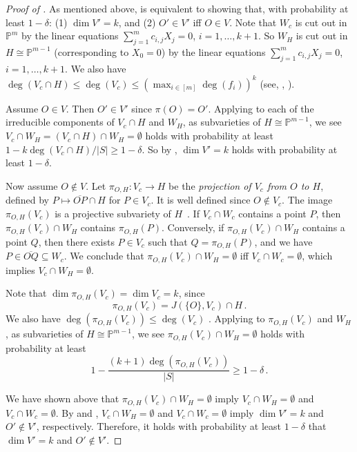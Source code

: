 \documentclass{toc}
\newcommand{\proj}{\mathbb{P}}
\begin{document}
\begin{proof}[Proof of ]
As mentioned above,  is equivalent to showing that, with probability at least $1-\delta$:  (1) $\dim V'=k$, and (2) $O'\in V'$ iff  $O\in V$.
Note that $W_c$ is cut out in $\proj^m$ by the linear equations $\sum_{j=1}^{m} c_{i,j} X_j=0$, $i=1,\dots,k+1$.
So $W_H$ is cut out in $H\cong \proj^{m-1}$ (corresponding to $X_0=0$) by the linear equations $\sum_{j=1}^m c_{i,j} X_j=0$, $i=1,\dots,k+1$. 
We also have $\deg(V_c\cap H)\leq \deg(V_c)\leq (\max_{i\in [m]}\deg(f_i))^k$ (see, \eg, \cite[Theorem~8.48]{burgisser2013algebraic}).

Assume $O\in V$. Then $O'\in V'$ since $\pi(O)=O'$. 
Applying  to  each of the irreducible components of $V_c\cap H$ and $W_H$, as subvarieties of $H\cong\proj^{m-1}$, we see $V_c\cap W_H=(V_c\cap H)\cap W_H=\emptyset$ holds with probability at least $1-k\deg(V_c \cap H)/|S|\geq 1-\delta$.
So by , $\dim V'=k$ holds with probability at least $1-\delta$.

Now assume $O\not\in V$. 
Let $\pi_{O, H}: V_c\to H$ be the \emph{projection of $V_c$ from $O$ to $H$}, defined by $P\mapsto \overline{OP}\cap H$ for $P\in V_c$. It is well defined since $O\not\in V_c$. 
The image $\pi_{O,H}(V_c)$ is a projective subvariety of $H$~\cite[Theorem~3.5]{Har92}. 
If $V_c\cap W_c$ contains a point $P$, then $\pi_{O,H}(V_c)\cap W_H$ contains $\pi_{O,H}(P)$.
Conversely, if $\pi_{O,H}(V_c)\cap W_H$ contains a point $Q$, then there exists $P\in V_c$ such that $Q=\pi_{O,H}(P)$, and we have $P\in\overline{O Q}\subseteq W_c$.
We conclude that $\pi_{O,H}(V_c)\cap W_H=\emptyset$ iff  $V_c\cap W_c=\emptyset$, which implies  $V_c\cap W_H=\emptyset$. 

Note that $\dim \pi_{O,H}(V_c)=\dim V_c=k$, since
\[
  \pi_{O,H}(V_c)=J(\{O\}, V_c)\cap H\,.
\]
We also have $\deg(\pi_{O,H}(V_c))\leq \deg(V_c)$
\cite[Example~18.16]{Har92}.  Applying 
to $\pi_{O,H}(V_c)$ and $W_H$, as subvarieties of $H\cong\proj^{m-1}$,
we see $\pi_{O,H}(V_c)\cap W_H=\emptyset$ holds with probability at
least
\[
  1-\frac{(k+1)\deg(\pi_{O,H}(V_c))}{|S|} \geq 1-\delta\,.
\]

We have shown above that  $\pi_{O,H}(V_c)\cap W_H=\emptyset$ imply $V_c\cap W_H=\emptyset$ and $V_c\cap W_c=\emptyset$.
By   and ,  $V_c\cap W_H=\emptyset$ and $V_c\cap W_c=\emptyset$ imply  $\dim V'=k$ and $O'\not\in V'$, respectively.
%
Therefore,  it holds with probability at least $1-\delta$ that $\dim V'=k$ and $O'\not\in V'$.
\end{proof}
\end{document}
